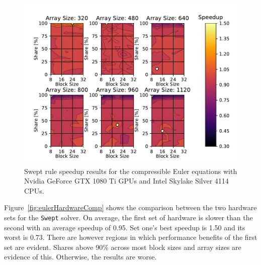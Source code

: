 \documentclass[journal,article,submit,moreauthors,pdftex]{Definitions/mdpi}
\def\Swept{\texttt{Swept}}
\newcommand\fs{1}
\def\oldCPU{Intel Skylake Silver 4114} %
\def\oldGPU{Nvidia GeForce GTX 1080 Ti}
\begin{document}
\begin{figure}
    \widefigure
    \begin{center}
        \includegraphics[scale=\fs, trim={0.75cm 0.4cm 0.8cm 0.7cm},clip]{figs/speedUpeulerOld.pdf}
        \caption{Swept rule speedup results  for the compressible Euler equations with \oldGPU{} GPUs and \oldCPU{} CPUs.}
        \label{fig:oldSpeedupEuler}
    \end{center}
\end{figure}
\begin{paracol}{2}
\linenumbers
\switchcolumn

Figure~\ref{fig:eulerHardwareComp} shows the comparison between the two hardware sets for the \Swept{} solver. On average, the first set of hardware is slower than the second with an average speedup of 0.95. Set one's best speedup is 1.50 and its worst is 0.73. There are however regions in which performance benefits of the first set are evident. Shares above 90\% across most block sizes and array sizes are evidence of this. Otherwise, the results are worse. 
\end{paracol}
\end{document}
